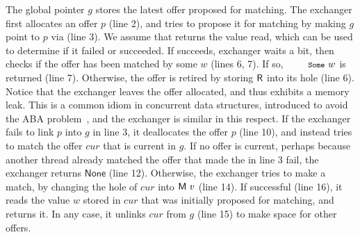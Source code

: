 The global pointer $g$ stores the latest offer proposed for
matching. The exchanger first allocates an offer $p$ (line 2), and
tries to propose it for matching by making $g$ point to $p$ via 
(line 3). We assume that  returns the value read, which can be used
to determine if it failed or succeeded. If  succeeds, exchanger
waits a bit, then checks if the offer has been matched by some $w$
(lines 6, 7). If so, $\esc{Some}\ w$ is returned (line 7). Otherwise,
the offer is retired by storing ${\mathsf{R}}$ into its hole (line
6). Notice that the exchanger leaves the offer allocated, and thus
exhibits a memory leak. This is a common idiom in concurrent data
structures, introduced to avoid the ABA
problem~\cite{Herlihy-Shavit:08,Treiber:TR}, and the exchanger is
similar in this respect.
%
If the exchanger fails to link $p$ into $g$ in line 3, it deallocates
the offer $p$ (line 10), and instead tries to match the offer $cur$
that is current in $g$. If no offer is current, perhaps because
another thread already matched the offer that made the  in line 3
fail, the exchanger returns $\mathsf{None}$ (line 12). Otherwise, the
exchanger tries to make a match, by changing the hole of $cur$ into
${\mathsf{M}\ v}$ (line 14). If successful (line 16), it reads the value $w$
stored in $cur$ that was initially proposed for matching, and returns
it. In any case, it unlinks $cur$ from $g$ (line 15) to make space for
other offers.
%

